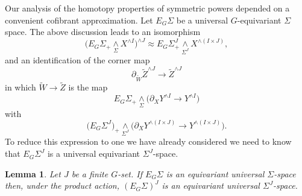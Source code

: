 \documentclass{amsart}
\newtheorem{lem}[equation]{Lemma}
\theoremstyle{definition}
\theoremstyle{remark}
\newcommand{\smashove}[1]{\underset{#1}{\wedge}}
\newcommand{\eggroup}[2]{E_{#1}#2}
\newcommand{\egsigma}[1]{\eggroup{#1}{\Sigma}}
\begin{document}
Our analysis of the homotopy properties of symmetric powers depended
on a convenient cofibrant approximation.   Let $\egsigma{G}$ be a
universal $G$-equivariant $\Sigma$ space.   The above discussion leads
to an isomorphism
\[
\big(\egsigma{G}_{+}\smashove{\Sigma} X^{\wedge
I}\big)^{\wedge J}
\approx 
\egsigma{G}^{J}_{+} \smashove{\Sigma^{J}} X^{\wedge(I\times J)},
\]
and an identification of the corner map
\[
\partial_{\tilde W}\tilde Z^{\wedge J} \to \tilde Z^{\wedge J}
\]
in which $\tilde W\to \tilde Z$ is the map
\[
\egsigma{G}_{+}\smashove{\Sigma}\big(\partial_{X}Y^{\wedge I} \to 
Y^{\wedge I}\big)
\]
with
\[
\big(\egsigma{G}^{J}\big)_{+} \smashove{\Sigma^{J}} \big(\partial_{X}Y^{\wedge(I\times J)}
\to Y^{\wedge(I\times J)}\big).
\]
To reduce this expression to one we have already considered we need to
know that $\egsigma{G}^{J}$ is a universal equivariant
$\Sigma^{J}$-space.

\begin{lem}
\label{thm:206} Let $J$ be a finite $G$-set.  If $\egsigma{G}$ is an
equivariant universal $\Sigma$-space then, under the product action,
$(\egsigma{G})^{J}$ is an equivariant universal $\Sigma^{J}$-space.
\end{lem}
\end{document}
